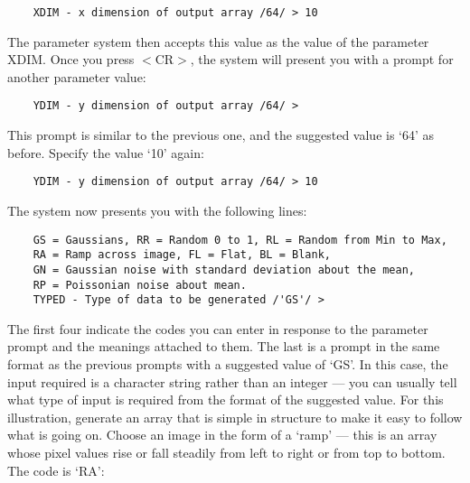 \begin{small}
\begin{verbatim}
    XDIM - x dimension of output array /64/ > 10
\end{verbatim}
\end{small}

The parameter system then accepts this value as the value of the parameter XDIM.
Once you press $<$CR$>$, the system will present you with a prompt for another
parameter value:

\begin{small}
\begin{verbatim}
    YDIM - y dimension of output array /64/ >
\end{verbatim}
\end{small}

This prompt is similar to the previous one, and the suggested value is `64' as
before.
Specify the value `10' again:

\begin{small}
\begin{verbatim}
    YDIM - y dimension of output array /64/ > 10
\end{verbatim}
\end{small}

The system now presents you with the following lines:

\begin{small}
\begin{verbatim}
    GS = Gaussians, RR = Random 0 to 1, RL = Random from Min to Max,
    RA = Ramp across image, FL = Flat, BL = Blank,
    GN = Gaussian noise with standard deviation about the mean,
    RP = Poissonian noise about mean.
    TYPED - Type of data to be generated /'GS'/ >
\end{verbatim}
\end{small}

The first four indicate the codes you can enter in response to the parameter
prompt and the meanings attached to them.
The last is a prompt in the same format as the previous prompts with a
suggested value of `GS'.
In this case, the input required is a character string rather than an integer
--- you can usually tell what type of input is required from the format of
the suggested value.
For this illustration, generate an array that is simple in structure to make
it easy to follow what is going on.
Choose an image in the form of a `ramp' --- this is an array whose
pixel values rise or fall steadily from left to right or from top to bottom.
The code is `RA':

